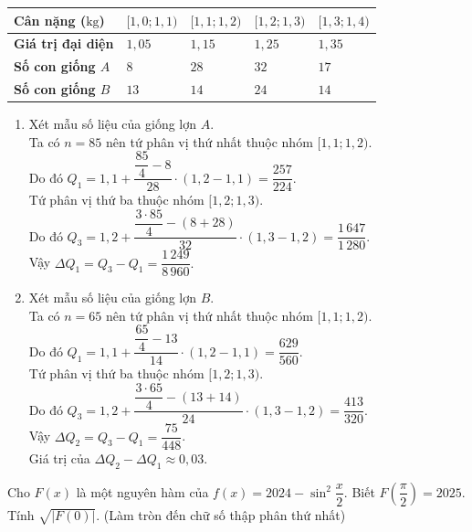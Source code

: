 \begin{ex}
{\begin{center}
\begin{tabular}{|>{\PBS\centering}m{4cm}|>{\PBS\centering}m{2cm}|>{\PBS\centering}m{2cm}| >{\PBS\centering}m{2cm}|>{\PBS\centering}m{2cm}|}
\textbf{Cân nặng ($\mathrm{kg}$)} &$[1{,}0;1{,}1)$&$[1{,}1;1{,}2)$&$[1{,}2;1{,}3)$&$[1{,}3;1{,}4)$\\
\hline
\textbf{Giá trị đại diện}&$1{,}05$&$1{,}15$&$1{,}25$&$1{,}35$\\
\hline
\textbf{Số con giống $A$}&$8$&$28$&$32$&$17$\\
\hline
\textbf{Số con giống $B$}&$13$&$14$&$24$&$14$\\
\hline
\end{tabular}
\end{center}
\begin{enumerate}[$\bullet$]
\item Xét mẫu số liệu của giống lợn $A$.\\
Ta có $n=85$ nên tứ phân vị thứ nhất thuộc nhóm $[1{,}1;1{,}2)$.\\
Do đó $Q_1=1{,}1+\dfrac{\dfrac{85}{4}-8}{28}\cdot (1{,}2-1{,}1)=\dfrac{257}{224}$.\\
Tứ phân vị thứ ba thuộc nhóm $[1{,}2;1{,}3)$.\\
Do đó $Q_3=1{,}2+\dfrac{\dfrac{3\cdot 85}{4}-(8+28)}{32}\cdot (1{,}3-1{,}2)=\dfrac{1\,647}{1\,280}$.\\
Vậy $\Delta Q_1=Q_3-Q_1=\dfrac{1\,249}{8\,960}.$
\item Xét mẫu số liệu của giống lợn $B$.\\
Ta có $n=65$ nên tứ phân vị thứ nhất thuộc nhóm $[1{,}1;1{,}2)$.\\
Do đó $Q_1=1{,}1+\dfrac{\dfrac{65}{4}-13}{14}\cdot (1{,}2-1{,}1)=\dfrac{629}{560}$.\\
Tứ phân vị thứ ba thuộc nhóm $[1{,}2;1{,}3)$.\\
Do đó $Q_3=1{,}2+\dfrac{\dfrac{3\cdot 65}{4}-(13+14)}{24}\cdot (1{,}3-1{,}2)=\dfrac{413}{320}$.\\
Vậy $\Delta Q_2=Q_3-Q_1=\dfrac{75}{448}$.\\
Giá trị của $\Delta Q_2-\Delta Q_1\approx 0,03$.
\end{enumerate}
}
\end{ex}

\begin{ex}%
Cho $F(x)$ là một nguyên hàm của $f(x)=2024-\sin^2 \dfrac{x}{2}$. Biết $F\left(\dfrac{\pi}{2}\right)=2025$. Tính $\sqrt{|F(0)|}$. (Làm tròn đến chữ số thập phân thứ nhất)
\end{ex}

